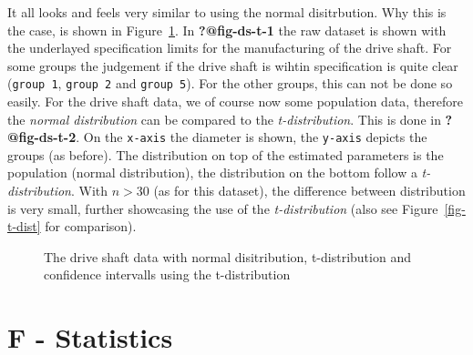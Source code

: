 \documentclass[
  a4paper,
]{scrbook}
\begin{document}
It all looks and feels very similar to using the normal disitrbution.
Why this is the case, is shown in Figure~\ref{fig-ds-t}. In
\textbf{?@fig-ds-t-1} the raw dataset is shown with the underlayed
specification limits for the manufacturing of the drive shaft. For some
groups the judgement if the drive shaft is wihtin specification is quite
clear (\texttt{group\ 1}, \texttt{group\ 2} and \texttt{group\ 5}). For
the other groups, this can not be done so easily. For the drive shaft
data, we of course now some population data, therefore the \emph{normal
distribution} can be compared to the \emph{t-distribution}. This is done
in \textbf{?@fig-ds-t-2}. On the \texttt{x-axis} the diameter is shown,
the \texttt{y-axis} depicts the groups (as before). The distribution on
top of the estimated parameters is the population (normal distribution),
the distribution on the bottom follow a \emph{t-distribution}. With
\(n>30\) (as for this dataset), the difference between distribution is
very small, further showcasing the use of the \emph{t-distribution}
(also see Figure~\ref{fig-t-dist} for comparison).

\begin{figure}[ht]


\caption{\label{fig-ds-t}The drive shaft data with normal disitribution,
t-distribution and confidence intervalls using the t-distribution}

\end{figure}%

\section{F - Statistics}\label{f---statistics}
\end{document}
